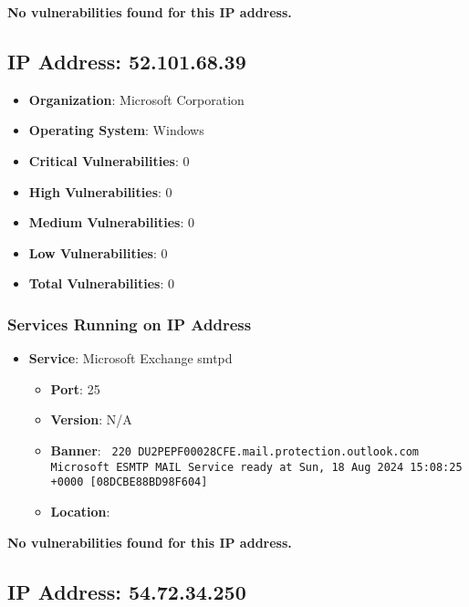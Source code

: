 \documentclass{article}
\begin{document}
\textbf{No vulnerabilities found for this IP address.}


\clearpage



\subsection*{IP Address: 52.101.68.39}

\begin{itemize}
    \item \textbf{Organization}: Microsoft Corporation
    \item \textbf{Operating System}:  Windows 
    \item \textbf{Critical Vulnerabilities}: 0
    \item \textbf{High Vulnerabilities}: 0
    \item \textbf{Medium Vulnerabilities}: 0
    \item \textbf{Low Vulnerabilities}: 0
    \item \textbf{Total Vulnerabilities}: 0
\end{itemize}

\subsubsection*{Services Running on IP Address}

\begin{itemize}
    
        \item \textbf{Service}: Microsoft Exchange smtpd
        \begin{itemize}
            \item \textbf{Port}: 25
            \item \textbf{Version}:  N/A 
            \item \textbf{Banner}: \texttt{ 220 DU2PEPF00028CFE.mail.protection.outlook.com Microsoft ESMTP MAIL Service ready at Sun, 18 Aug 2024 15:08:25 +0000 [08DCBE88BD98F604]
 }
            \item \textbf{Location}: \href{  }{  }
        \end{itemize}
    
\end{itemize}


\textbf{No vulnerabilities found for this IP address.}


\clearpage



\subsection*{IP Address: 54.72.34.250}
\end{document}
